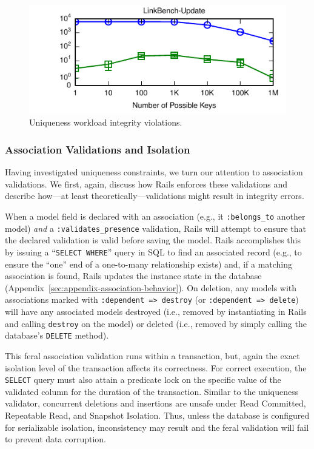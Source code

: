 \begin{figure}
\begin{center}
\begin{minipage}{\figscale\columnwidth}
\includegraphics[width=\figscale\columnwidth]{figs/pk-workload-linkbench-upd-violations.pdf}
\end{minipage}\vspace{.5em}
\caption{Uniqueness workload integrity violations.}
\label{fig:pk-workload}
\end{center}
\end{figure}

\subsubsection{Association Validations and Isolation}

Having investigated uniqueness constraints, we turn our attention to
association validations. We first, again, discuss how Rails enforces
these validations and describe how---at least
theoretically---validations might result in integrity errors.

When a model field is declared with an association (e.g., it
\texttt{:belongs\_to} another model) \textit{and} a
\texttt{:validates\_presence} validation, Rails will attempt to ensure
that the declared validation is valid before saving the model. Rails
accomplishes this by issuing a ``\texttt{SELECT WHERE}'' query in SQL
to find an associated record (e.g., to ensure the ``one'' end of a
one-to-many relationship exists) and, if a matching association is
found, Rails updates the instance state in the database
(Appendix~\ref{sec:appendix-association-behavior}). On deletion, any
models with associations marked with \texttt{:dependent => destroy}
(or \texttt{:dependent => delete}) will have any associated models
destroyed (i.e., removed by instantiating in Rails and calling
\texttt{destroy} on the model) or deleted (i.e., removed by simply
calling the database's \texttt{DELETE} method).

This feral association validation runs within a transaction, but,
again the exact isolation level of the transaction affects its
correctness. For correct execution, the \texttt{SELECT} query must
also attain a predicate lock on the specific value of the validated
column for the duration of the transaction. Similar to the uniqueness
validator, concurrent deletions and insertions are unsafe under Read
Committed, Repeatable Read, and Snapshot Isolation. Thus, unless the
database is configured for serializable isolation, inconsistency may
result and the feral validation will fail to prevent data corruption.


